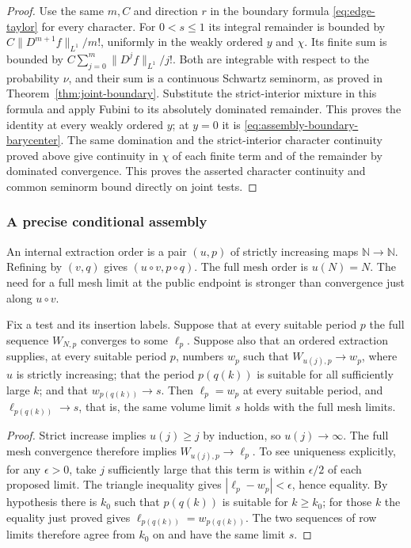 \begin{proof}
Use the same $m,C$ and direction $r$ in the boundary formula
\eqref{eq:edge-taylor} for every character. For $0<s\le1$ its integral
remainder is bounded by
$C\|D^{m+1}f\|_{L^1}/m!$, uniformly in the weakly ordered $y$ and
$\chi$. Its finite sum is bounded by
$C\sum_{j=0}^m\|D^jf\|_{L^1}/j!$. Both are integrable with respect
to the probability $\nu$, and their sum is a continuous Schwartz
seminorm, as proved in Theorem~\ref{thm:joint-boundary}. Substitute the
strict-interior mixture in this formula and apply Fubini to its
absolutely dominated remainder. This proves the identity at every weakly ordered $y$; at $y=0$ it is
\eqref{eq:assembly-boundary-barycenter}. The same domination and the
strict-interior character continuity proved above give continuity in
$\chi$ of each finite term and of the remainder by dominated
convergence. This proves the asserted character continuity and common
seminorm bound directly on joint tests.
\end{proof}

\subsubsection{A precise conditional assembly}
An internal extraction order is a pair \((u,p)\) of strictly increasing
maps \(\mathbb N\to\mathbb N\). Refining by \((v,q)\) gives
\((u\circ v,p\circ q)\). The full mesh order is \(u(N)=N\).
The need for a full mesh limit at the public endpoint is stronger than
convergence just along \(u\circ v\).

\begin{lemma}\label{ex-full-mesh}
Fix a test and its insertion labels. Suppose that at every suitable period
\(p\) the full sequence \(W_{N,p}\) converges to some \(\ell_p\).
Suppose also that an ordered extraction supplies, at every suitable period
\(p\), numbers \(w_p\) such that \(W_{u(j),p}\to w_p\), where \(u\) is
strictly increasing; that the period \(p(q(k))\) is suitable for all
sufficiently large \(k\); and that \(w_{p(q(k))}\to s\). Then
\(\ell_p=w_p\) at every suitable period, and
\(\ell_{p(q(k))}\to s\), that is, the same volume limit \(s\) holds with
the full mesh limits.
\end{lemma}
\begin{proof}
Strict increase implies \(u(j)\ge j\) by induction, so \(u(j)\to\infty\).
The full mesh convergence therefore implies
\(W_{u(j),p}\to\ell_p\). To see uniqueness explicitly, for any
\(\epsilon>0\), take \(j\) sufficiently large that this term is within
\(\epsilon/2\) of each proposed limit. The triangle inequality gives
\(|\ell_p-w_p|<\epsilon\), hence equality. By hypothesis there is
\(k_0\) such that \(p(q(k))\) is suitable for \(k\ge k_0\); for those
\(k\) the equality just proved gives \(\ell_{p(q(k))}=w_{p(q(k))}\).
The two sequences of row limits therefore agree from \(k_0\) on and have
the same limit \(s\).
\end{proof}

